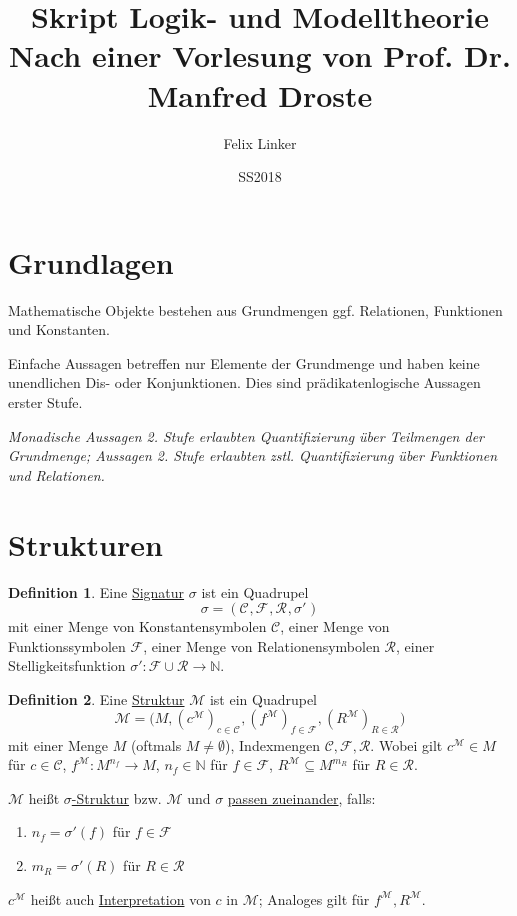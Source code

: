 \documentclass{article}
\title{Skript Logik- und Modelltheorie \\ \large{Nach einer Vorlesung von Prof. Dr. Manfred Droste}}
\author{Felix Linker}
\date{SS2018}
\theoremstyle{definition}
\newtheorem{dfn}{Definition}[section]
\theoremstyle{plain}
\newcommand{\m}[1]{\mathcal{#1}}
\newcommand{\sign}[1]{(\m{C}_{#1}, \m{F}_{#1}, \m{R}_{#1}, \sigma'_{#1})}
\newcommand{\struc}[3]{\big(#1, (c^{#2})_{c \in \m{C}_{#3}}, (f^{#2})_{f \in \m{F}_{#3}}, (R^{#2})_{R \in \m{R}_{#3}}\big)}
\begin{document}
    \maketitle

    \nocite{*}
    
    

    \section*{Grundlagen}

    Mathematische Objekte bestehen aus Grundmengen ggf. Relationen, Funktionen und Konstanten.

    Einfache Aussagen betreffen nur Elemente der Grundmenge und haben keine unendlichen Dis- oder Konjunktionen.
    Dies sind prädikatenlogische Aussagen erster Stufe.

    \textit{Monadische Aussagen 2. Stufe erlaubten Quantifizierung über Teilmengen der Grundmenge; Aussagen 2. Stufe erlaubten zstl. Quantifizierung über Funktionen und Relationen.}

    \section{Strukturen}

    \begin{dfn}
        Eine \underline{Signatur} $ \sigma $ ist ein Quadrupel
        \begin{equation}
            \sigma = \sign{}
        \end{equation}
        mit einer Menge von Konstantensymbolen $ \m{C} $, einer Menge von Funktionssymbolen $ \m{F} $, einer Menge von Relationensymbolen $ \m{R} $, einer Stelligkeitsfunktion $ \sigma' : \m{F} \cup \m{R} \rightarrow \mathbb{N} $.
    \end{dfn}

    \begin{dfn}
        Eine \underline{Struktur} $ \m{M} $ ist ein Quadrupel
        \begin{equation}
            \m{M} = \struc{M}{\m{M}}{}
        \end{equation}
        mit einer Menge $ M $ (oftmals $ M \neq \emptyset $), Indexmengen $ \m{C}, \m{F}, \m{R} $.
        Wobei gilt $ c^\m{M} \in M $ für $ c \in \m{C} $, $ f^\m{M} : M^{n_f} \rightarrow M $, $ n_f \in \mathbb{N} $ für $ f \in \m{F} $, $ R^\m{M} \subseteq M^{m_R} $ für $ R \in \m{R} $.

        $ \m{M} $ heißt \underline{$ \sigma $-Struktur} bzw. $ \m{M} $ und $ \sigma $ \underline{passen zueinander}, falls:
        \begin{enumerate}
            \item $ n_f = \sigma'(f) $ für $ f \in \m{F} $
            \item $ m_R = \sigma'(R) $ für $ R \in \m{R} $
        \end{enumerate}

        $ c^\m{M} $ heißt auch \underline{Interpretation} von $ c $ in $ \m{M} $; Analoges gilt für $ f^\m{M}, R^\m{M} $.
    \end{dfn}
\end{document}
